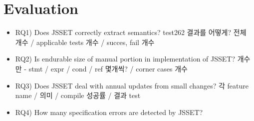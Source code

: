 \section{Evaluation}

\begin{itemize}
  \item RQ1) Does JSSET correctly extract semantics? 
    test262 결과를 어떻게? 전체 개수 / applicable tests 개수 / succes, fail 개수
  \item RQ2) Is endurable size of manual portion in implementation of JSSET? 
    개수만 - stmt / expr / cond / ref 몇개씩? / corner cases 개수
  \item RQ3) Does JSSET deal with annual updates from small changes? 
    각 feature name / 의미 / compile 성공률 / 결과 test
  \item RQ4) How many specification errors are detected by JSSET? 
\end{itemize}
